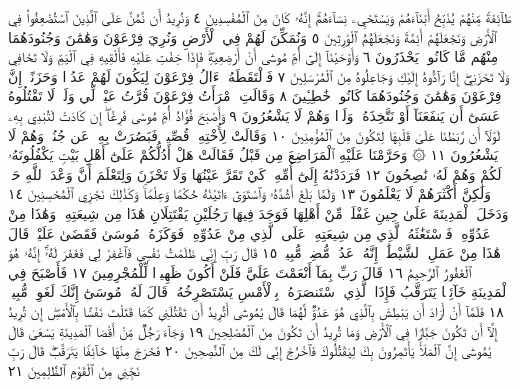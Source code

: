 طَآئِفَةࣰ مِّنْهُمْ يُذَبِّحُ أَبْنَآءَهُمْ وَيَسْتَحْيِۦ نِسَآءَهُمْۚ إِنَّهُۥ كَانَ
مِنَ ٱلْمُفْسِدِينَ ٤ وَنُرِيدُ أَن نَّمُنَّ عَلَى ٱلَّذِينَ ٱسْتُضْعِفُوا۟
فِي ٱلْأَرْضِ وَنَجْعَلَهُمْ أَئِمَّةࣰ وَنَجْعَلَهُمُ ٱلْوَٰرِثِينَ ٥
وَنُمَكِّنَ لَهُمْ فِي ٱلْأَرْضِ وَنُرِيَ فِرْعَوْنَ وَهَٰمَٰنَ وَجُنُودَهُمَا
مِنْهُم مَّا كَانُوا۟ يَحْذَرُونَ ٦ وَأَوْحَيْنَآ إِلَىٰٓ أُمِّ مُوسَىٰٓ
أَنْ أَرْضِعِيهِۖ فَإِذَا خِفْتِ عَلَيْهِ فَأَلْقِيهِ فِي ٱلْيَمِّ وَلَا تَخَافِي
وَلَا تَحْزَنِيٓۖ إِنَّا رَآدُّوهُ إِلَيْكِ وَجَاعِلُوهُ مِنَ ٱلْمُرْسَلِينَ ٧
فَٱلْتَقَطَهُۥٓ ءَالُ فِرْعَوْنَ لِيَكُونَ لَهُمْ عَدُوࣰّا وَحَزَنًاۗ إِنَّ
فِرْعَوْنَ وَهَٰمَٰنَ وَجُنُودَهُمَا كَانُوا۟ خَٰطِـِٔينَ ٨
وَقَالَتِ ٱمْرَأَتُ فِرْعَوْنَ قُرَّتُ عَيْنࣲ لِّي وَلَكَۖ لَا تَقْتُلُوهُ
عَسَىٰٓ أَن يَنفَعَنَآ أَوْ نَتَّخِذَهُۥ وَلَدࣰا وَهُمْ لَا يَشْعُرُونَ ٩
وَأَصْبَحَ فُؤَادُ أُمِّ مُوسَىٰ فَٰرِغًاۖ إِن كَادَتْ لَتُبْدِي بِهِۦ لَوْلَآ
أَن رَّبَطْنَا عَلَىٰ قَلْبِهَا لِتَكُونَ مِنَ ٱلْمُؤْمِنِينَ ١٠ وَقَالَتْ
لِأُخْتِهِۦ قُصِّيهِۖ فَبَصُرَتْ بِهِۦ عَن جُنُبࣲ وَهُمْ لَا يَشْعُرُونَ ١١
۞ وَحَرَّمْنَا عَلَيْهِ ٱلْمَرَاضِعَ مِن قَبْلُ فَقَالَتْ هَلْ أَدُلُّكُمْ
عَلَىٰٓ أَهْلِ بَيْتࣲ يَكْفُلُونَهُۥ لَكُمْ وَهُمْ لَهُۥ نَٰصِحُونَ ١٢
فَرَدَدْنَٰهُ إِلَىٰٓ أُمِّهِۦ كَيْ تَقَرَّ عَيْنُهَا وَلَا تَحْزَنَ وَلِتَعْلَمَ
أَنَّ وَعْدَ ٱللَّهِ حَقࣱّ وَلَٰكِنَّ أَكْثَرَهُمْ لَا يَعْلَمُونَ ١٣
وَلَمَّا بَلَغَ أَشُدَّهُۥ وَٱسْتَوَىٰٓ ءَاتَيْنَٰهُ حُكْمࣰا وَعِلْمࣰاۚ وَكَذَٰلِكَ نَجْزِي
ٱلْمُحْسِنِينَ ١٤ وَدَخَلَ ٱلْمَدِينَةَ عَلَىٰ حِينِ غَفْلَةࣲ مِّنْ أَهْلِهَا
فَوَجَدَ فِيهَا رَجُلَيْنِ يَقْتَتِلَانِ هَٰذَا مِن شِيعَتِهِۦ وَهَٰذَا مِنْ عَدُوِّهِۦۖ
فَٱسْتَغَٰثَهُ ٱلَّذِي مِن شِيعَتِهِۦ عَلَى ٱلَّذِي مِنْ عَدُوِّهِۦ فَوَكَزَهُۥ
مُوسَىٰ فَقَضَىٰ عَلَيْهِۖ قَالَ هَٰذَا مِنْ عَمَلِ ٱلشَّيْطَٰنِۖ إِنَّهُۥ عَدُوࣱّ مُّضِلࣱّ
مُّبِينࣱ ١٥ قَالَ رَبِّ إِنِّي ظَلَمْتُ نَفْسِي فَٱغْفِرْ لِي فَغَفَرَ لَهُۥٓۚ إِنَّهُۥ
هُوَ ٱلْغَفُورُ ٱلرَّحِيمُ ١٦ قَالَ رَبِّ بِمَآ أَنْعَمْتَ عَلَيَّ فَلَنْ أَكُونَ
ظَهِيرࣰا لِّلْمُجْرِمِينَ ١٧ فَأَصْبَحَ فِي ٱلْمَدِينَةِ خَآئِفࣰا يَتَرَقَّبُ فَإِذَا
ٱلَّذِي ٱسْتَنصَرَهُۥ بِٱلْأَمْسِ يَسْتَصْرِخُهُۥۚ قَالَ لَهُۥ مُوسَىٰٓ إِنَّكَ لَغَوِيࣱّ
مُّبِينࣱ ١٨ فَلَمَّآ أَنْ أَرَادَ أَن يَبْطِشَ بِٱلَّذِي هُوَ عَدُوࣱّ لَّهُمَا قَالَ
يَٰمُوسَىٰٓ أَتُرِيدُ أَن تَقْتُلَنِي كَمَا قَتَلْتَ نَفْسَۢا بِٱلْأَمْسِۖ إِن تُرِيدُ
إِلَّآ أَن تَكُونَ جَبَّارࣰا فِي ٱلْأَرْضِ وَمَا تُرِيدُ أَن تَكُونَ مِنَ
ٱلْمُصْلِحِينَ ١٩ وَجَآءَ رَجُلࣱ مِّنْ أَقْصَا ٱلْمَدِينَةِ يَسْعَىٰ قَالَ يَٰمُوسَىٰٓ
إِنَّ ٱلْمَلَأَ يَأْتَمِرُونَ بِكَ لِيَقْتُلُوكَ فَٱخْرُجْ إِنِّي لَكَ مِنَ ٱلنَّٰصِحِينَ ٢٠
فَخَرَجَ مِنْهَا خَآئِفࣰا يَتَرَقَّبُۖ قَالَ رَبِّ نَجِّنِي مِنَ ٱلْقَوْمِ ٱلظَّٰلِمِينَ ٢١
